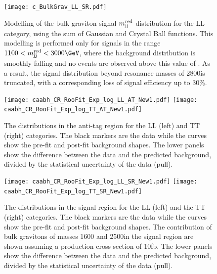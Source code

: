 \begin{figure}[h]
\centering
\texttt{[image: c\_BulkGrav\_LL\_SR.pdf]}
\caption{Modelling of the bulk graviton signal $m_{\text{jj}}^{\text{red}}$ distribution
  for the LL category, using the sum of Gaussian and Crystal Ball
  functions. This modelling is performed only for signals in the range $1100 < \mjjs <
  3000\GeV$, where the background distribution is smoothly falling and no events are observed above this value of \mjjs. As a result, the signal distribution beyond resonance masses
  of 2800\GeV is truncated, with a corresponding loss of signal
  efficiency up to 30\%.}
\label{fig:sigmodel}
\end{figure}

\begin{figure}[h]
\centering
\texttt{[image: caabh\_CR\_RooFit\_Exp\_log\_LL\_AT\_New1.pdf]}
\texttt{[image: caabh\_CR\_RooFit\_Exp\_log\_TT\_AT\_New1.pdf]}
  \caption{The \mjjs distributions in the anti-tag region for the LL
    (left) and TT (right) categories. The black markers are the data
    while the curves show the pre-fit and post-fit background
    shapes. The lower panels show the difference between the data and
    the predicted background, divided by the statistical uncertainty
    of the data (pull).}
\label{fig:AABH_AT}
\end{figure}

\begin{figure}[h]
\centering
\texttt{[image: caabh\_CR\_RooFit\_Exp\_log\_LL\_SR\_New1.pdf]}
\texttt{[image: caabh\_CR\_RooFit\_Exp\_log\_TT\_SR\_New1.pdf]}
\caption{The \mjjs distributions in the signal region for the LL
  (left) and the TT (right) categories. The black markers are the data
  while the curves show the pre-fit and post-fit background
  shapes. The contribution of bulk gravitons of masses 1600 and
  2500\GeV in the signal region are shown assuming a production cross
  section of 10\unit{fb}. 
  The lower panels show the difference between the data and the predicted
  background, divided by the statistical uncertainty of the data
  (pull).}
\label{fig:AABH_SR}
\end{figure}



